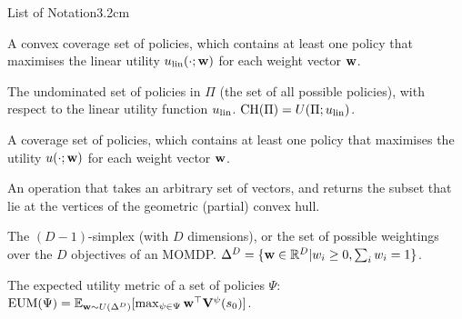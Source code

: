 \begin{mclistof}{List of Notation}{3.2cm}
    \\
    \item[$\textnormal{CCS}(\Pi)$] 
        A convex coverage set of policies, which contains at least one policy that maximises the linear utility $u_{{\textnormal{lin}}}(\cdot;\mathbf{w})$ for each weight vector $\mathbf{w}$.
    \item[$\textnormal{CH}(\Pi)$] 
        The undominated set of policies in $\Pi$ (the set of all possible policies), with respect to the linear utility function $u_{{\textnormal{lin}}}$. $\textnormal{CH}(\Pi)=U(\Pi;u_{{\textnormal{lin}}})$.
    \item[$\textnormal{CS}(\Pi;u)$] 
        A coverage set of policies, which contains at least one policy that maximises the utility $u(\cdot;\mathbf{w})$ for each weight vector $\mathbf{w}$.
    \item[$\cprune$] 
        An operation that takes an arbitrary set of vectors, and returns the subset that lie at the vertices of the geometric (partial) convex hull. 
    \item[$\Delta^D$] 
        The $(D-1)$-simplex (with $D$ dimensions), or the set of possible weightings over the $D$ objectives of an MOMDP. $\Delta^D = \{\mathbf{w}\in\mathbb{R}^D|w_i \geq 0, \sum_i w_i = 1\}$.
    \item[$\eum(\Psi)$]
        The \textnormal{expected utility metric} of a set of policies $\Psi$: ${\textnormal{EUM}}(\Psi)=\mathbb{E}_{\mathbf{w}\sim U(\Delta^D)}[\max_{\psi\in\Psi}\mathbf{w}^\top\mathbf{V}^\psi(s_0)]$.
    \item[$\HV(\bfcl{V};\rref)$]

\end{mclistof}
